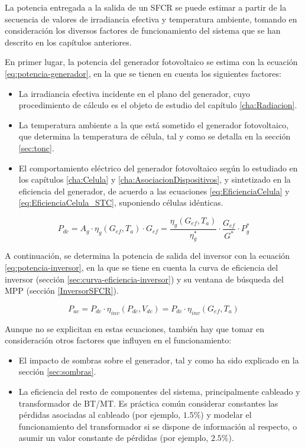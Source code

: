 La potencia entregada a la salida de un SFCR se puede estimar a partir de la secuencia de valores de irradiancia efectiva y temperatura ambiente, tomando en consideración los diversos factores de funcionamiento del sistema que se han descrito en los capítulos anteriores.

En primer lugar, la potencia del generador fotovoltaico se estima con la ecuación \ref{eq:potencia-generador}, en la que se tienen en cuenta los siguientes factores:
\begin{itemize}
\item La irradiancia efectiva incidente en el plano del generador,
  cuyo procedimiento de cálculo es el objeto de estudio del capítulo
  \ref{cha:Radiacion}.
\item La temperatura ambiente a la que está sometido el generador
  fotovoltaico, que determina la temperatura de célula, tal y como se
  detalla en la sección \ref{sec:tonc}.
\item El comportamiento eléctrico del generador fotovoltaico según lo
  estudiado en los capítulos \ref{cha:Celula} y
  \ref{cha:AsociacionDispositivos}, y sintetizado en la eficiencia del
  generador, de acuerdo a las ecuaciones \ref{eq:EficienciaCelula} y
  \ref{eq:EficienciaCelula_STC}, suponiendo células idénticas.
\end{itemize}

\begin{equation}
  P_{dc} = A_g \cdot \eta_g(G_{ef}, T_a) \cdot  G_{ef} = %
  \frac{\eta_g(G_{ef}, T_a)}{\eta_g^*} \cdot \frac{G_{ef}}{G^*} \cdot P_g^*
  \label{eq:potencia-generador}
\end{equation}

A continuación, se determina la potencia de salida del inversor con la ecuación \ref{eq:potencia-inversor}, en la que se tiene en cuenta la curva de eficiencia del inversor (sección \ref{sec:curva-eficiencia-inversor}) y su ventana de búsqueda del
MPP (sección \ref{InversorSFCR}).

\begin{equation}
  P_{ac} = P_{dc} \cdot \eta_{inv}(P_{dc}, V_{dc}) =  P_{dc} \cdot \eta_{inv}(G_{ef}, T_a)
  \label{eq:potencia-inversor}
\end{equation}

Aunque no se explicitan en estas ecuaciones, también hay que tomar en consideración otros factores que influyen en el funcionamiento:
\begin{itemize}
\item El impacto de sombras sobre el generador, tal y como ha sido
  explicado en la sección \ref{sec:sombras}.
\item La eficiencia del resto de componentes del sistema,
  principalmente cableado y transformador de BT/MT. Es práctica común
  considerar constantes las pérdidas asociadas al cableado (por
  ejemplo, $1.5\%$) y modelar el funcionamiento del transformador si
  se dispone de información al respecto, o asumir un valor constante
  de pérdidas (por ejemplo, $2.5\%$).
\end{itemize}

